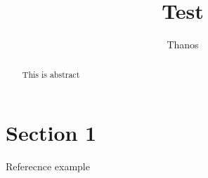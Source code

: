 \documentclass[a4paper,11pt]{article}
\title{Test}
\author{Thanos}
\begin{document}
\maketitle
\tableofcontents

\begin{abstract}
  This is abstract
\end{abstract}

\section{Section 1}

Referecnce example~\cite{nasution2023pedestrian}



\end{document}

